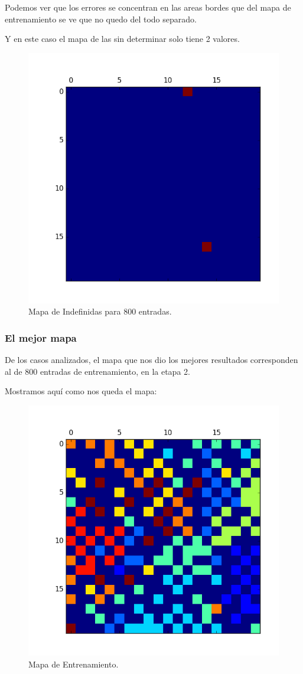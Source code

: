 Podemos ver que los errores se concentran en las areas bordes que del mapa
de entrenamiento se ve que no quedo del todo separado.

Y en este caso el mapa de las sin determinar solo tiene 2 valores.


\begin{figure}[H]
  \centering
  \includegraphics[width=0.5\columnwidth]{secciones/graficos/kohonen/mapaindefinidas800.png}
  \caption{Mapa de Indefinidas para 800 entradas.}
  \label{fig:mapa indefinidas 800}
\end{figure}


\subsubsection{El mejor mapa}

De los casos analizados, el mapa que nos dio los mejores resultados corresponden
al de 800 entradas de entrenamiento, en la etapa 2.

Mostramos aquí como nos queda el mapa:

\begin{figure}[H]
  \centering
  \includegraphics[width=0.5\columnwidth]{secciones/graficos/kohonen/mapaentrenamientomejor.png}
  \caption{Mapa de Entrenamiento.}
  \label{fig:mapa train}
\end{figure}


